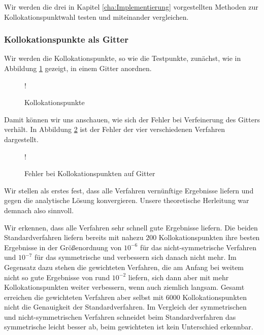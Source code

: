 Wir werden die drei in Kapitel \ref{cha:Implementierung} vorgestellten Methoden zur Kollokationspunktwahl testen und miteinander vergleichen. 
\subsubsection{Kollokationspunkte als Gitter}
Wir werden die Kollokationspunkte, so wie die Testpunkte, zunächst, wie in Abbildung \ref{fig:Kollok} gezeigt, in einem Gitter anordnen.
\begin{figure}[ht]
\centering
\resizebox {.8\columnwidth} {!} {

}
\caption{Kollokationspunkte}
\label{fig:Kollok}
\end{figure}

Damit können wir uns anschauen, wie sich der Fehler bei Verfeinerung des Gitters verhält. In Abbildung \ref{fig:error} ist der Fehler der vier verschiedenen Verfahren dargestellt. 
\begin{figure}[ht]
\centering
\resizebox {\columnwidth} {!} {

}
\caption{Fehler bei Kollokationspunkten auf Gitter}
\label{fig:error}
\end{figure}

Wir stellen als erstes fest, dass alle Verfahren vernünftige Ergebnisse liefern und gegen die analytische Lösung konvergieren. Unsere theoretische Herleitung war demnach also sinnvoll. 

Wir erkennen, dass alle Verfahren sehr schnell gute Ergebnisse liefern. Die beiden Standardverfahren liefern bereits mit nahezu $200$ Kollokationspunkten ihre besten Ergebnisse in der Größenordnung von $10^{-6}$ für das nicht-symmetrische Verfahren und $10^{-7}$ für das symmetrische und verbessern sich danach nicht mehr. Im Gegensatz dazu stehen die gewichteten Verfahren, die am Anfang bei weitem nicht so gute Ergebnisse von rund $10^{-2}$ liefern, sich dann aber mit mehr Kollokationspunkten weiter verbessern, wenn auch ziemlich langsam. Gesamt erreichen die gewichteten Verfahren aber selbst mit $6000$ Kollokationspunkten nicht die Genauigkeit der Standardverfahren. Im Vergleich der symmetrischen und nicht-symmetrischen Verfahren schneidet beim Standardverfahren das symmetrische leicht besser ab, beim gewichteten ist kein Unterschied erkennbar.

